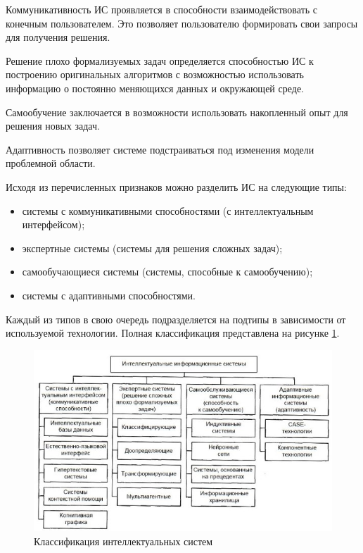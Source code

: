 Коммуникативность ИС проявляется в способности взаимодействовать с конечным пользователем. Это позволяет пользователю формировать свои запросы для получения решения.

Решение плохо формализуемых задач определяется способностью ИС к построению оригинальных алгоритмов с возможностью использовать информацию о постоянно меняющихся данных и окружающей среде.
    
Самообучение заключается в возможности использовать накопленный опыт для решения новых задач.
    
Адаптивность позволяет системе подстраиваться под изменения модели проблемной области.
    
Исходя из перечисленных признаков можно разделить ИС на следующие типы:
    
\begin{itemize}
\item системы с коммуникативными способностями (с интеллектуальным интерфейсом);
\item экспертные системы (системы для решения сложных задач);
\item самообучающиеся системы (системы, способные к самообучению);
\item системы с адаптивными способностями.
\end{itemize}

Каждый из типов в свою очередь подразделяется на подтипы в зависимости от используемой технологии.\cite{is1} Полная классификация представлена на рисунке \ref{fig:ISTypes}.

\begin{figure}[htbp]
	\centering
	\includegraphics[width=\linewidth]{fig/ISTypes.jpg}
	\caption{Классификация интеллектуальных систем}%
	\label{fig:ISTypes}
\end{figure}

